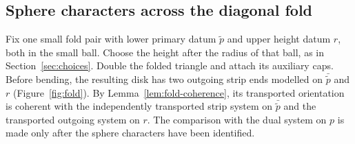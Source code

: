 \documentclass[11pt]{amsart}
\theoremstyle{definition}
\theoremstyle{remark}
\theoremstyle{plain}
\numberwithin{equation}{section}
\begin{document}
\subsection{Sphere characters across the diagonal fold}
Fix one small fold pair with lower
primary datum $\widetilde p$ and upper
height datum $r$, both in the small
ball. Choose the height after the radius
of that ball, as in
Section~\ref{sec:choices}. Double the
folded triangle and attach its auxiliary
caps. Before bending, the resulting disk has two outgoing
strip ends modelled on $\bar{\widetilde p}$ and $r$
(Figure~\ref{fig:fold}).
By Lemma~\ref{lem:fold-coherence}, its transported orientation
is coherent with the independently transported strip system on
$\bar{\widetilde p}$ and the transported outgoing system on $r$.
The comparison with the dual system on $p$ is made only after
the sphere characters have been identified.
\end{document}
